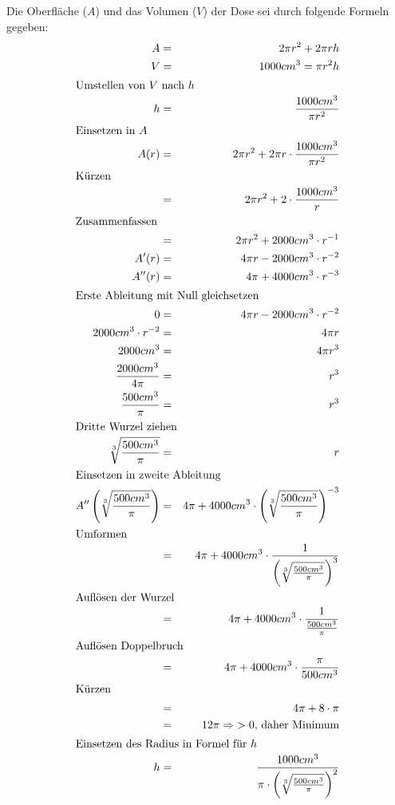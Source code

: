 \documentclass[10pt,a4paper,oneside,ngerman,numbers=noenddot]{scrartcl}
\begin{document}
\subsection{} %
Die Oberfläche ($A$) und das Volumen ($V$) der Dose sei durch folgende Formeln gegeben:\\
\begin{alignat*}{2}
A &=& 2\pi r^{2} + 2\pi rh \\
V &=& 1000 cm^{3} = \pi r^{2}h \\
\intertext{Umstellen von $V$ nach $h$}
h &=& \frac{1000 cm^{3}}{\pi r^{2}} \\
\intertext{Einsetzen in $A$}
A(r) &=& 2 \pi r^{2} + 2 \pi r \cdot \frac{1000 cm^{3}}{\pi r^{2}} \\
\intertext{Kürzen}
&=& 2 \pi r^{2} + 2 \cdot \frac{1000 cm^{3}}{r} \\
\intertext{Zusammenfassen}
&=& 2 \pi r^{2} + 2000 cm^{3} \cdot r^{-1} \\
A'(r) &=& 4 \pi r - 2000 cm^{3} \cdot r^{-2} \\
A''(r) &=& 4 \pi + 4000 cm^{3} \cdot r^{-3} \\
\intertext{Erste Ableitung mit Null gleichsetzen}
0 &=& 4 \pi r - 2000 cm^{3} \cdot r^{-2} \\
2000 cm^{3} \cdot r^{-2} &=& 4 \pi r \\
2000 cm^{3} &=& 4 \pi r^{3} \\
\frac{2000 cm^{3}}{4 \pi} &=& r^{3} \\
\frac{500 cm^{3}}{\pi} &=& r^{3} \\
\intertext{Dritte Wurzel ziehen}
\sqrt[3]{\frac{500 cm^{3}}{\pi}} &=& r \\
\intertext{Einsetzen in zweite Ableitung}
A''\left(\sqrt[3]{\frac{500 cm^{3}}{\pi}} \right) &=& 4 \pi + 4000 cm^{3} \cdot \left(\sqrt[3]{\frac{500 cm^{3}}{\pi}}\right)^{-3} \\
\intertext{Umformen}
&=& 4 \pi + 4000 cm^{3} \cdot \frac{1}{\left(\sqrt[3]{\frac{500 cm^{3}}{\pi}} \right)^{3}} \\
\intertext{Auflösen der Wurzel}
&=& 4 \pi + 4000 cm^{3} \cdot \frac{1}{\frac{500 cm^{3}}{\pi}} \\
\intertext{Auflösen Doppelbruch}
&=& 4 \pi + 4000 cm^{3} \cdot \frac{\pi}{500 cm^{3}} \\
\intertext{Kürzen}
&=& 4 \pi + 8 \cdot \pi \\
&=& 12 \pi \Rightarrow \text{$>0$, daher Minimum} \\
\intertext{Einsetzen des Radius in Formel für $h$}
h &=& \frac{1000 cm^{3}}{\pi \cdot  \left(\sqrt[3]{\frac{500 cm^{3}}{\pi}} \right)^{2}} \\

\end{alignat*}
\end{document}
